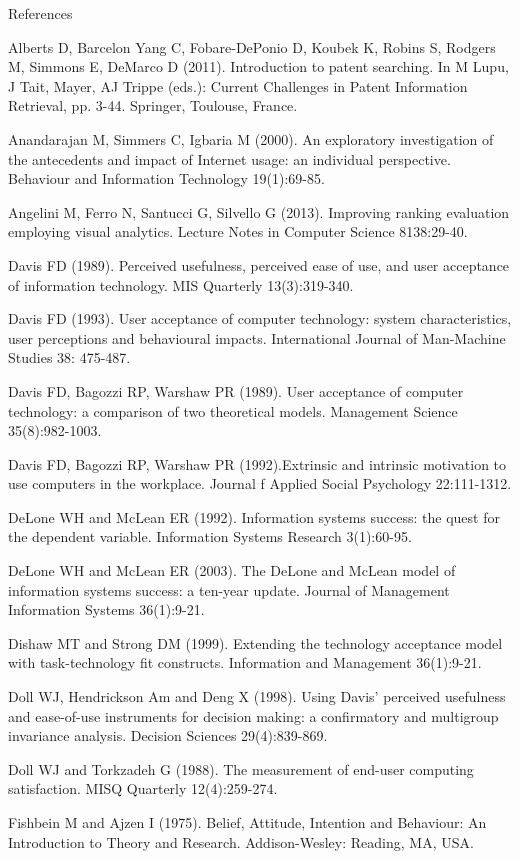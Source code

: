 \documentclass[11pt]{article}
\begin{document}
\iffalse
References

Alberts D, Barcelon Yang C, Fobare-DePonio D, Koubek K, Robins S, Rodgers M, Simmons E, DeMarco D (2011). Introduction to patent searching. In M Lupu, J Tait, Mayer, AJ Trippe (eds.): Current Challenges in Patent Information Retrieval, pp. 3-44. Springer, Toulouse, France.

Anandarajan M, Simmers C, Igbaria M (2000). An exploratory investigation of the antecedents and impact of Internet usage: an individual perspective. Behaviour and Information Technology 19(1):69-85.

Angelini M, Ferro N, Santucci G, Silvello G (2013). Improving ranking evaluation employing visual analytics. Lecture Notes in Computer Science 8138:29-40.

Davis FD (1989). Perceived usefulness, perceived ease of use, and user acceptance of information technology. MIS Quarterly 13(3):319-340.

Davis FD (1993). User acceptance of computer technology: system characteristics, user perceptions and behavioural impacts. International Journal of Man-Machine Studies 38: 475-487.

Davis FD, Bagozzi RP, Warshaw PR (1989). User acceptance of computer technology: a comparison of two theoretical models. Management Science 35(8):982-1003.

Davis FD, Bagozzi RP, Warshaw PR (1992).Extrinsic and intrinsic motivation to use computers in the workplace. Journal f Applied Social Psychology 22:111-1312.

DeLone WH and McLean ER (1992). Information systems success: the quest for the dependent variable. Information Systems Research 3(1):60-95.

DeLone WH and McLean ER (2003). The DeLone and McLean model of information systems success: a ten-year update. Journal of Management Information Systems 36(1):9-21.

Dishaw MT and Strong DM (1999). Extending the technology acceptance model with task-technology fit constructs. Information and Management 36(1):9-21.

Doll WJ, Hendrickson Am and Deng X (1998). Using Davis’ perceived usefulness and ease-of-use instruments for decision making: a confirmatory and multigroup invariance analysis. Decision Sciences 29(4):839-869.

Doll WJ and Torkzadeh G (1988). The measurement of end-user computing satisfaction. MISQ Quarterly 12(4):259-274.

Fishbein M and Ajzen I (1975). Belief, Attitude, Intention and Behaviour: An Introduction to Theory and Research. Addison-Wesley: Reading, MA, USA.
\end{document}

